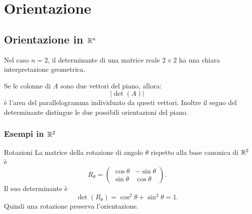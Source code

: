 \documentclass[a4paper]{article}
\begin{document}
\section{Orientazione}

\subsection{Orientazione in \(\mathbb{R}^n\)}

Nel caso \(n=2\), il determinante di una matrice reale \(2\times 2\) ha una chiara interpretazione geometrica.

Se le colonne di \(A\) sono due vettori del piano, allora:
\[
    |\det(A)|
\]
è l'area del parallelogramma individuato da questi vettori. Inoltre il segno del determinante distingue le due possibili orientazioni del piano.

\begin{center}
\end{center}

\subsubsection{Esempi in \(\mathbb{R}^2\)}

\begin{snippetexample}{Rotazioni}
    La matrice della rotazione di angolo \(\theta\) rispetto alla base canonica di \(\mathbb{R}^2\) è
    \[
        R_\theta=
        \begin{pmatrix}
            \cos\theta & -\sin\theta\\
            \sin\theta & \cos\theta
        \end{pmatrix}.
    \]
    Il suo determinante è
    \[
        \det(R_\theta)
        =
        \cos^2\theta+\sin^2\theta
        =
        1.
    \]
    Quindi una rotazione preserva l'orientazione.
\end{snippetexample}
\end{document}
